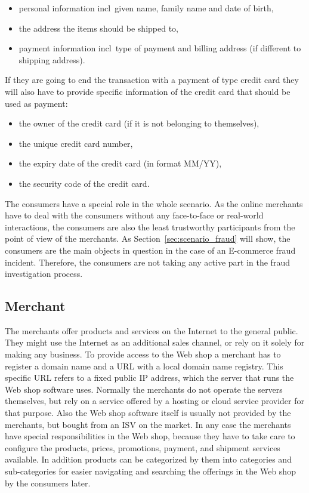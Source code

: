\begin{itemize}
		\item personal information \gls{incl}\ given name, family name and date of birth,
		\item the address the items should be shipped to,
		\item payment information \gls{incl}\ type of payment and billing address (if different to shipping address).
\end{itemize}

If they are going to end the transaction with a payment of type credit card they will also have to provide specific information of the credit card that should be used as payment:\@

\begin{itemize}
		\item the owner of the credit card (if it is not belonging to themselves),
		\item the unique credit card number,
		\item the expiry date of the credit card (in format MM/YY),
		\item the security code of the credit card.
\end{itemize}

The consumers have a special role in the whole scenario. As the online merchants have to deal with the consumers without any face-to-face or real-world interactions, the consumers are also the least trustworthy participants from the point of view of the merchants. As Section~\ref{sec:scenario_fraud} will show, the consumers are the main objects in question in the case of an \gls{E-commerce} fraud incident. Therefore, the consumers are not taking any active part in the fraud investigation process.


\subsection{Merchant}
\label{subsec:stakeholder_merchant}

The merchants offer products and services on the Internet to the general public. They might use the Internet as an additional sales channel, or rely on it solely for making any business. To provide access to the Web shop a merchant has to register a domain name and a \gls{URL} with a local domain name registry. This specific \gls{URL} refers to a fixed public \gls{IP} address, which the server that runs the Web shop software uses. Normally the merchants do not operate the servers themselves, but rely on a service offered by a hosting or cloud service provider for that purpose. Also the Web shop software itself is usually not provided by the merchants, but bought from an \gls{ISV} on the market. In any case the merchants have special responsibilities in the Web shop, because they have to take care to configure the products, prices, promotions, payment, and shipment services available. In addition products can be categorized by them into categories and sub-categories for easier navigating and searching the offerings in the Web shop by the consumers later. \\

